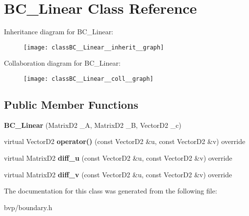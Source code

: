 \hypertarget{classBC__Linear}{}\section{B\+C\+\_\+\+Linear Class Reference}
\label{classBC__Linear}


Inheritance diagram for B\+C\+\_\+\+Linear\+:\nopagebreak
\begin{figure}[H]
\begin{center}
\leavevmode
\texttt{[image: classBC\_\_Linear\_\_inherit\_\_graph]}
\end{center}
\end{figure}


Collaboration diagram for B\+C\+\_\+\+Linear\+:\nopagebreak
\begin{figure}[H]
\begin{center}
\leavevmode
\texttt{[image: classBC\_\_Linear\_\_coll\_\_graph]}
\end{center}
\end{figure}
\subsection*{Public Member Functions}
\begin{DoxyCompactItemize}
\item 
\mbox{\label{classBC__Linear_aaf6acbb563402c281a76c7809c5a9a8e}} 
{\bfseries B\+C\+\_\+\+Linear} (Matrix\+D2 \+\_\+A, Matrix\+D2 \+\_\+B, Vector\+D2 \+\_\+c)
\item 
\mbox{\label{classBC__Linear_a025c57de07ed39bafb89c55733b64642}} 
virtual Vector\+D2 {\bfseries operator()} (const Vector\+D2 \&u, const Vector\+D2 \&v) override
\item 
\mbox{\label{classBC__Linear_ac1acab2a5bea96494677bd93848d59b8}} 
virtual Matrix\+D2 {\bfseries diff\+\_\+u} (const Vector\+D2 \&u, const Vector\+D2 \&v) override
\item 
\mbox{\label{classBC__Linear_ae052ce17da0beeee6d96cf1a8fe26a7a}} 
virtual Matrix\+D2 {\bfseries diff\+\_\+v} (const Vector\+D2 \&u, const Vector\+D2 \&v) override
\end{DoxyCompactItemize}


The documentation for this class was generated from the following file\+:\begin{DoxyCompactItemize}
\item 
bvp/boundary.\+h\end{DoxyCompactItemize}

